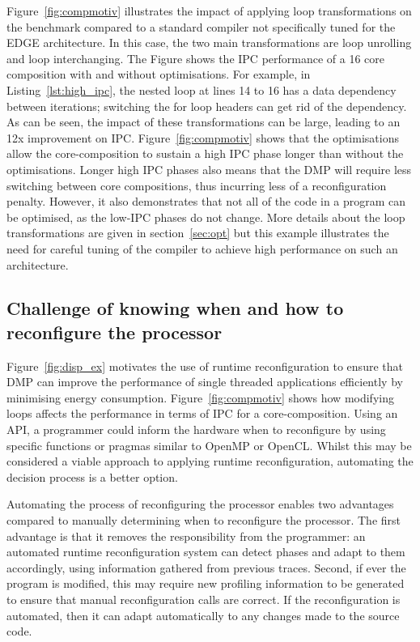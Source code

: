 Figure~\ref{fig:compmotiv} illustrates the impact of applying loop transformations on the  benchmark compared to a standard compiler not specifically tuned for the EDGE architecture.
In this case, the two main transformations are loop unrolling and loop interchanging.
The Figure shows the IPC performance of a 16 core composition with and without optimisations.
For example, in Listing~\ref{lst:high_ipc}, the nested loop at lines 14 to 16 has a data dependency between iterations; switching the for loop headers can get rid of the dependency.
As can be seen, the impact of these transformations can be large, leading to an 12x improvement on IPC.
Figure~\ref{fig:compmotiv} shows that the optimisations allow the core-composition to sustain a high IPC phase longer than without the optimisations.
Longer high IPC phases also means that the DMP will require less switching between core compositions, thus incurring less of a reconfiguration penalty.
However, it also demonstrates that not all of the code in a program can be optimised, as the low-IPC phases do not change.
More details about the loop transformations are given in section~\ref{sec:opt} but this example illustrates the need for careful tuning of the compiler to achieve high performance on such an architecture.

\subsection{Challenge of knowing when and how to reconfigure the processor}

Figure~\ref{fig:disp_ex} motivates the use of runtime reconfiguration to ensure that DMP can improve the performance of single threaded applications efficiently by minimising energy consumption.
Figure~\ref{fig:compmotiv} shows how modifying loops affects the performance in terms of IPC for a core-composition.
Using an API, a programmer could inform the hardware when to reconfigure by using specific functions or pragmas similar to OpenMP or OpenCL.
Whilst this may be considered a viable approach to applying runtime reconfiguration, automating the decision process is a better option.

Automating the process of reconfiguring the processor enables two advantages compared to manually determining when to reconfigure the processor.
The first advantage is that it removes the responsibility from the programmer: an automated runtime reconfiguration system can detect phases and adapt to them accordingly, using information gathered from previous traces.
Second, if ever the program is modified, this may require new profiling information to be generated to ensure that manual reconfiguration calls are correct.
If the reconfiguration is automated, then it can adapt automatically to any changes made to the source code.

